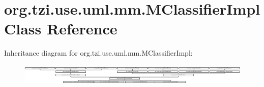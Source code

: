 \hypertarget{classorg_1_1tzi_1_1use_1_1uml_1_1mm_1_1_m_classifier_impl}{\section{org.\-tzi.\-use.\-uml.\-mm.\-M\-Classifier\-Impl Class Reference}
\label{classorg_1_1tzi_1_1use_1_1uml_1_1mm_1_1_m_classifier_impl}
}
Inheritance diagram for org.\-tzi.\-use.\-uml.\-mm.\-M\-Classifier\-Impl\-:\begin{figure}[H]
\begin{center}
\leavevmode
\includegraphics[height=1.028278cm]{classorg_1_1tzi_1_1use_1_1uml_1_1mm_1_1_m_classifier_impl}
\end{center}
\end{figure}
